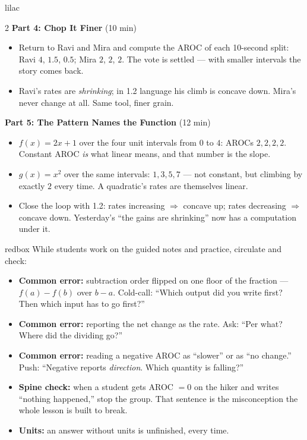 \documentclass[10pt]{article}
\begin{document}
\begin{skillbox}[Lesson]{lilac}
\begin{multicols}{2}
\textbf{Part 4: Chop It Finer} (10 min)

\begin{itemize}
  \item Return to Ravi and Mira and compute the AROC of each 10-second split:
        Ravi $4$, $1.5$, $0.5$; Mira $2$, $2$, $2$. The vote is settled ---
        with smaller intervals the story comes back.
  \item Ravi's rates are \textit{shrinking}; in 1.2 language his climb is
        concave down. Mira's never change at all. Same tool, finer grain.
\end{itemize}

\textbf{Part 5: The Pattern Names the Function} (12 min)

\begin{itemize}
  \item $f(x) = 2x+1$ over the four unit intervals from $0$ to $4$: AROCs
        $2,2,2,2$. Constant AROC \textit{is} what linear means, and that
        number is the slope.
  \item $g(x) = x^2$ over the same intervals: $1, 3, 5, 7$ --- not constant,
        but climbing by exactly $2$ every time. A quadratic's rates are
        themselves linear.
  \item Close the loop with 1.2: rates increasing $\Rightarrow$ concave up;
        rates decreasing $\Rightarrow$ concave down. Yesterday's ``the gains
        are shrinking'' now has a computation under it.
\end{itemize}
\end{multicols}
\end{skillbox}

\begin{skillbox}{redbox}
While students work on the guided notes and practice, circulate and check:
\begin{itemize}
  \item \textbf{Common error:} subtraction order flipped on one floor of the
        fraction --- $f(a)-f(b)$ over $b-a$. Cold-call: ``Which output did you
        write first? Then which input has to go first?''
  \item \textbf{Common error:} reporting the net change as the rate. Ask:
        ``Per what? Where did the dividing go?''
  \item \textbf{Common error:} reading a negative AROC as ``slower'' or as
        ``no change.'' Push: ``Negative reports \textit{direction}. Which
        quantity is falling?''
  \item \textbf{Spine check:} when a student gets AROC $=0$ on the hiker and
        writes ``nothing happened,'' stop the group. That sentence is the
        misconception the whole lesson is built to break.
  \item \textbf{Units:} an answer without units is unfinished, every time.
\end{itemize}
\end{skillbox}
\end{document}

